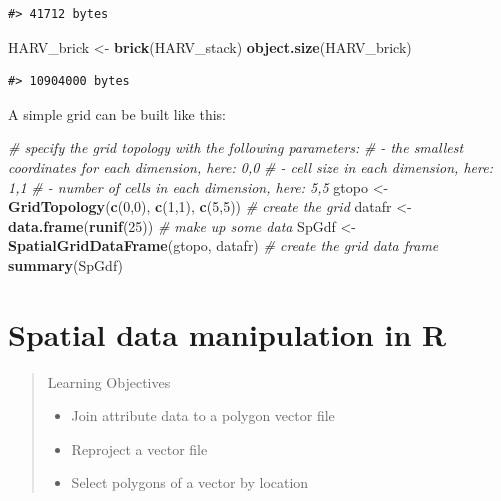 \documentclass[]{book}
\newenvironment{Shaded}{\begin{snugshade}}{\end{snugshade}}
\newcommand{\KeywordTok}[1]{\textcolor[rgb]{0.13,0.29,0.53}{\textbf{#1}}}
\newcommand{\DecValTok}[1]{\textcolor[rgb]{0.00,0.00,0.81}{#1}}
\newcommand{\StringTok}[1]{\textcolor[rgb]{0.31,0.60,0.02}{#1}}
\newcommand{\CommentTok}[1]{\textcolor[rgb]{0.56,0.35,0.01}{\textit{#1}}}
\newcommand{\NormalTok}[1]{#1}
\providecommand{\tightlist}{%
  \setlength{\itemsep}{0pt}\setlength{\parskip}{0pt}}
\theoremstyle{definition}
\theoremstyle{definition}
\theoremstyle{definition}
\theoremstyle{remark}
\begin{document}
\begin{verbatim}
#> 41712 bytes
\end{verbatim}

\begin{Shaded}
\begin{Highlighting}[]
\NormalTok{HARV_brick <-}\StringTok{ }\KeywordTok{brick}\NormalTok{(HARV_stack)}
\KeywordTok{object.size}\NormalTok{(HARV_brick)}
\end{Highlighting}
\end{Shaded}

\begin{verbatim}
#> 10904000 bytes
\end{verbatim}

A simple grid can be built like this:

\begin{Shaded}
\begin{Highlighting}[]
\CommentTok{# specify the grid topology with the following parameters:}
\CommentTok{# - the smallest coordinates for each dimension, here: 0,0}
\CommentTok{# - cell size in each dimension, here: 1,1 }
\CommentTok{# - number of cells in each dimension, here: 5,5}
\NormalTok{gtopo <-}\StringTok{ }\KeywordTok{GridTopology}\NormalTok{(}\KeywordTok{c}\NormalTok{(}\DecValTok{0}\NormalTok{,}\DecValTok{0}\NormalTok{), }\KeywordTok{c}\NormalTok{(}\DecValTok{1}\NormalTok{,}\DecValTok{1}\NormalTok{), }\KeywordTok{c}\NormalTok{(}\DecValTok{5}\NormalTok{,}\DecValTok{5}\NormalTok{)) }\CommentTok{# create the grid}
\NormalTok{datafr <-}\StringTok{ }\KeywordTok{data.frame}\NormalTok{(}\KeywordTok{runif}\NormalTok{(}\DecValTok{25}\NormalTok{)) }\CommentTok{# make up some data}
\NormalTok{SpGdf <-}\StringTok{ }\KeywordTok{SpatialGridDataFrame}\NormalTok{(gtopo, datafr) }\CommentTok{# create the grid data frame}
\KeywordTok{summary}\NormalTok{(SpGdf)}
\end{Highlighting}
\end{Shaded}

\chapter{Spatial data manipulation in R}\label{spatialops}

\begin{quote}
Learning Objectives

\begin{itemize}
\tightlist
\item
  Join attribute data to a polygon vector file
\item
  Reproject a vector file
\item
  Select polygons of a vector by location
\end{itemize}
\end{quote}
\end{document}
